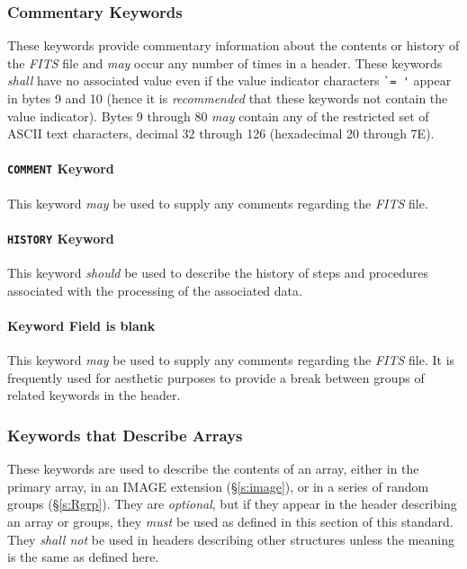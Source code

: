\documentclass[11pt,makeidx]{book}     %
\begin{document}
 \subsubsection{Commentary Keywords}
  \label{s:comk}

 These keywords provide commentary information about the contents or history
 of the {\em FITS\/} file and {\em may} occur any number of times in a header.
 These keywords {\em shall} have no associated value
 even if the value indicator characters \verb*+`= '+ appear in bytes 9 and 10
 (hence it is {\em recommended} that these keywords not contain the value indicator).
 Bytes 9 through 80 {\em may} contain any of the restricted set of ASCII
 text characters, decimal 32 through 126 (hexadecimal 20 through 7E).
  
  \paragraph{{\tt COMMENT} Keyword}  
  This keyword {\em may} be used to supply any comments regarding the {\em FITS\/} file.

 \paragraph{{\tt HISTORY} Keyword}
  This keyword {\em should} be used to describe 
  the history of steps and procedures associated
 with the processing of the associated data.
  
 \paragraph{Keyword Field is blank}
  This keyword {\em may} be used to supply any comments regarding the {\em FITS\/} file.
  It is frequently used for aesthetic purposes to provide a break between 
  groups of related keywords in the header.

   \subsubsection{Keywords that Describe Arrays}
   \label{s:array}
   These keywords are used to describe the contents of an
   array, either in the primary array, in an IMAGE extension
   (\S\ref{s:image}), or in a series of
   random groups (\S\ref{s:Rgrp}).
   They are {\em optional}, but if they appear in the header describing 
   an array or groups, they {\em must} be used as defined in this
   section of this standard. They {\em shall not} be used in headers
   describing other structures unless the meaning is the same
   as defined here.
  
\end{document}
